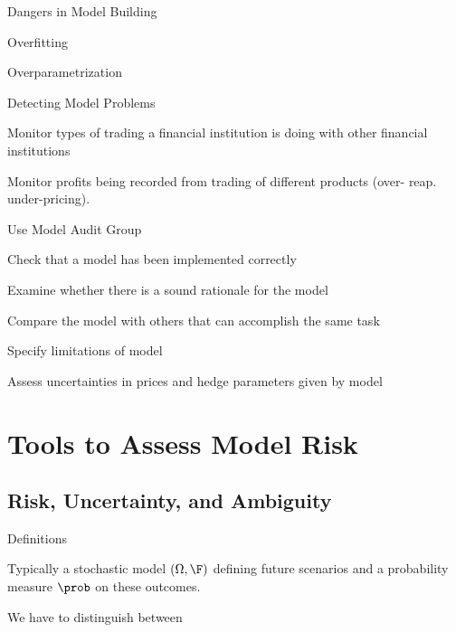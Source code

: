 	Dangers in Model Building






	Overfitting


	Overparametrization






	Detecting Model Problems






	Monitor types of trading a financial institution is doing with other financial institutions


	Monitor profits being recorded from trading of different products (over- reap. under-pricing).


	Use Model Audit Group






	Check that a model has been implemented correctly


	Examine whether there is a sound rationale for the model


	Compare the model with others that can accomplish the same task


	Specify limitations of model


	Assess uncertainties in prices and hedge parameters given by model













\section{Tools to Assess Model Risk}
\subsection{Risk, Uncertainty, and Ambiguity}

{Definitions}






	Typically a stochastic model $(\Omega, \F)$ defining future scenarios and a
probability measure $\prob$ on these outcomes.


	We have to distinguish between


